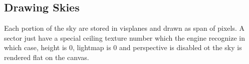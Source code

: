 \subsection{Drawing Skies}
Each portion of the sky are stored in visplanes and drawn as span of pixels. A sector just have a special ceiling texture number which the engine recognize in which case, height is 0, lightmap is 0 and perspective is disabled ot the sky is rendered flat on the canvas.






























